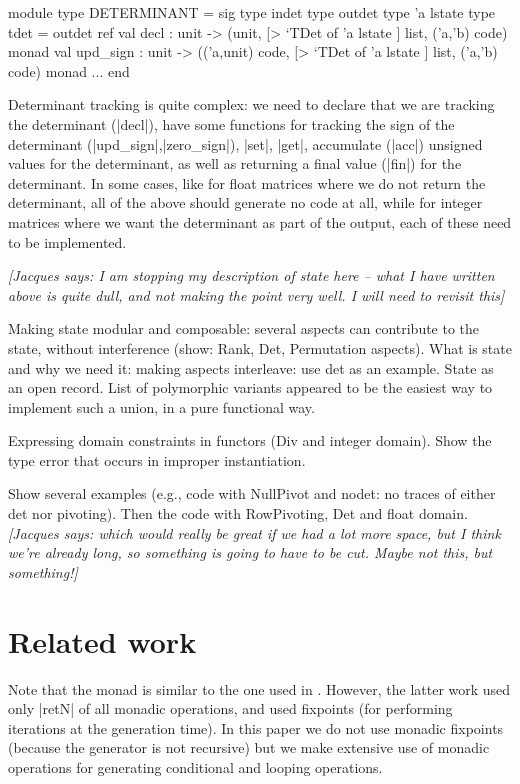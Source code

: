 \documentclass{llncs}
\newcommand{\jacques}[1]{{\it [Jacques says: #1]}}
\begin{document}
\begin{small}
\begin{code}
module type DETERMINANT = sig
  type indet  type outdet  type 'a lstate
  type tdet = outdet ref   
  val decl : unit -> 
    (unit, [> `TDet of 'a lstate ] list, ('a,'b) code) monad
  val upd_sign : unit -> 
    (('a,unit) code, [> `TDet of 'a lstate ] list, ('a,'b) code) monad
  ...
end
\end{code}
\end{small}
\noindent  Determinant tracking is quite complex: we need to 
declare that we are tracking the determinant (|decl|), have some functions
for tracking the sign of the determinant (|upd_sign|,|zero_sign|),
|set|, |get|, accumulate (|acc|) unsigned values for the determinant, as 
well as returning a final value (|fin|) for the determinant.  In some cases,
like for float matrices where we do not return the determinant, all of
the above should generate no code at all, while for integer matrices where
we want the determinant as part of the output, each of these need to be
implemented.

\jacques{I am stopping my description of state here -- what I have
written above is quite dull, and not making the point very well.
I will need to revisit this}

Making state modular and composable: several aspects can contribute
to the state, without interference (show: Rank, Det, Permutation
aspects).
What is state and why we need it: making aspects interleave: use det
as an example. State as an open record. List of polymorphic variants
appeared to be the easiest way to implement such a union, in a pure
functional way.

Expressing domain constraints in functors (Div and integer domain).
Show the type error that occurs in improper instantiation.

Show several examples (e.g., code with NullPivot and nodet: no traces
of either det nor pivoting). Then the code with RowPivoting, Det and
float domain. \jacques{which would really be great if we had a lot 
more space, but I think we're already long, so something is going to
have to be cut.  Maybe not this, but something!}

\section{Related work}\label{related}

Note that the monad is similar to the one used in \cite{KiselyovTaha}.
However, the latter work used only |retN| of all monadic operations,
and used fixpoints (for performing iterations at the generation time).
In this paper we do not use monadic fixpoints (because the generator
is not recursive) but we make extensive use of monadic operations for
generating conditional and looping operations.
\end{document}

